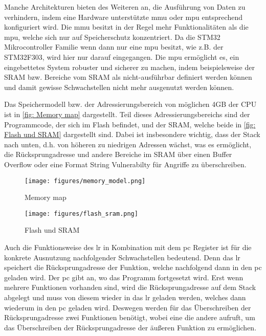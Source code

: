 \documentclass[a4paper,
DIV=13,
12pt,
BCOR=10mm,
department=FakIM,
oneside,
parskip=half,
automark,
listof=totocnumbered,
bibliography=totocnumbered,
acronym=totocnumbered
] {OTHRartcl}
\begin{document}
Manche Architekturen bieten des Weiteren an, die Ausführung von Daten zu verhindern, indem eine Hardware unterstützte \ac{mmu} oder \ac{mpu} entsprechend konfiguriert wird.
Die \ac{mmu} besitzt in der Regel mehr Funktionalitäten als die \ac{mpu}, welche sich nur auf Speicherschutz konzentriert.
Da die STM32 Mikrocontroller Familie wenn dann nur eine \ac{mpu} besitzt, wie z.B. der STM32F303, wird hier nur darauf eingegangen.
Die \ac{mpu} ermöglicht es, ein eingebettetes System robuster und sicherer zu machen, indem beispielsweise der SRAM bzw. Bereiche vom SRAM als nicht-ausführbar definiert werden können
und damit gewisse Schwachstellen nicht mehr ausgenutzt werden können. \cite{MPU}

Das Speichermodell bzw. der Adressierungsbereich von möglichen 4GB der CPU ist in \autoref{fig: Memory map} dargestellt.
Teil dieses Adressierungsbereichs sind der Programmcode, der sich im Flash befindet, und der SRAM, welche beide in \autoref{fig: Flash und SRAM} dargestellt sind.
Dabei ist insbesondere wichtig, dass der Stack nach unten, d.h. von höheren zu niedrigen Adressen wächst, was es ermöglicht,
die Rücksprungadresse und andere Bereiche im SRAM über einen Buffer Overflow oder eine Format String Vulnerabilty für Angriffe zu überschreiben. \cite{STM32F103Cx DataSheets}
\begin{figure}[ht!]
  \begin{minipage}[b]{.45\linewidth}
    \texttt{[image: figures/memory\_model.png]}
    \caption{Memory map}
    \label{fig: Memory map}
  \end{minipage}
  \hspace{.1\linewidth}
  \begin{minipage}[b]{.48\linewidth}
    \texttt{[image: figures/flash\_sram.png]}
    \caption{Flash und SRAM}
    \label{fig: Flash und SRAM}
  \end{minipage}
\end{figure}

Auch die Funktionsweise des \ac{lr} in Kombination mit dem \ac{pc} Register ist für die konkrete Ausnutzung nachfolgender Schwachstellen bedeutend.
Denn das \ac{lr} speichert die Rücksprungadresse der Funktion, welche nachfolgend dann in den \ac{pc} geladen wird. Der \ac{pc} gibt an, wo das Programm fortgesetzt wird.
Erst wenn mehrere Funktionen vorhanden sind, wird die Rücksprungadresse auf dem Stack abgelegt und muss von
diesem wieder in das \ac{lr} geladen werden, welches dann wiederum in den \ac{pc} geladen wird. \cite{ARM Modell Overview}
Deswegen werden für das Überschreiben der Rücksprungadresse zwei Funktionen benötigt, wobei eine die andere aufruft, um das Überschreiben der Rücksprungadresse der äußeren Funktion zu ermöglichen.
\end{document}
